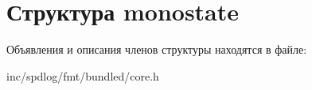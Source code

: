\hypertarget{structmonostate}{}\section{Структура monostate}
\label{structmonostate}


Объявления и описания членов структуры находятся в файле\+:\begin{DoxyCompactItemize}
\item 
inc/spdlog/fmt/bundled/core.\+h\end{DoxyCompactItemize}
